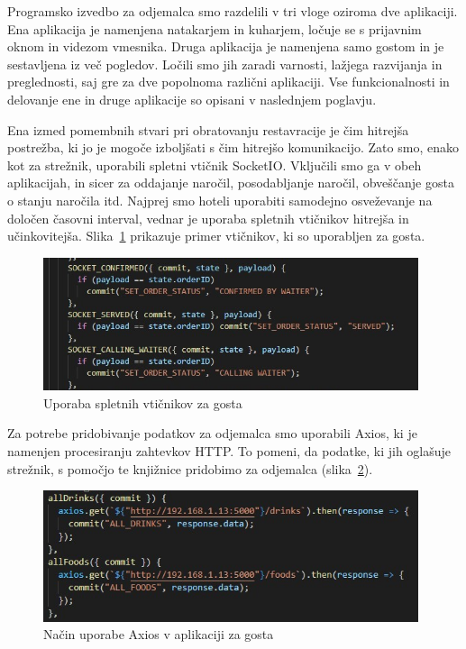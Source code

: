 \documentclass[a4paper, 12pt]{book}
\begin{document}
Programsko izvedbo za odjemalca smo razdelili v tri vloge oziroma dve aplikaciji. Ena aplikacija je namenjena natakarjem in kuharjem, ločuje se s prijavnim oknom in videzom vmesnika. Druga aplikacija je namenjena samo gostom in je sestavljena iz več pogledov. Ločili smo jih zaradi varnosti, lažjega razvijanja in preglednosti, saj gre za dve popolnoma različni aplikaciji. Vse funkcionalnosti in delovanje ene in druge aplikacije so opisani v naslednjem poglavju.

Ena izmed pomembnih stvari pri obratovanju restavracije je čim hitrejša postrežba, ki jo je mogoče izboljšati s čim hitrejšo komunikacijo. Zato smo, enako kot za strežnik, uporabili spletni vtičnik SocketIO. Vključili smo ga v obeh aplikacijah, in sicer za oddajanje naročil, posodabljanje naročil, obveščanje gosta o stanju naročila itd. Najprej smo hoteli uporabiti samodejno osveževanje na določen časovni interval, vednar je uporaba spletnih vtičnikov hitrejša in učinkovitejša. Slika~\ref{socketioo1} prikazuje primer vtičnikov, ki so uporabljen za gosta.

\begin{figure}[!htb]
\begin{center}
\includegraphics[width=11cm]{socketio_2.jpg}
\caption{Uporaba spletnih vtičnikov za gosta}
\label{socketioo1}
\end{center}
\end{figure}

Za potrebe pridobivanje podatkov za odjemalca smo uporabili Axios, ki je namenjen procesiranju zahtevkov  HTTP. To pomeni, da podatke, ki jih oglašuje strežnik, s pomočjo te knjižnice pridobimo za odjemalca (slika~\ref{axios_1}). 

\begin{figure}[!htb]
\begin{center}
\includegraphics[width=11cm]{axios_1.jpg}
\caption{Način uporabe Axios v aplikaciji za gosta}
\label{axios_1}
\end{center}
\end{figure}
\end{document}
